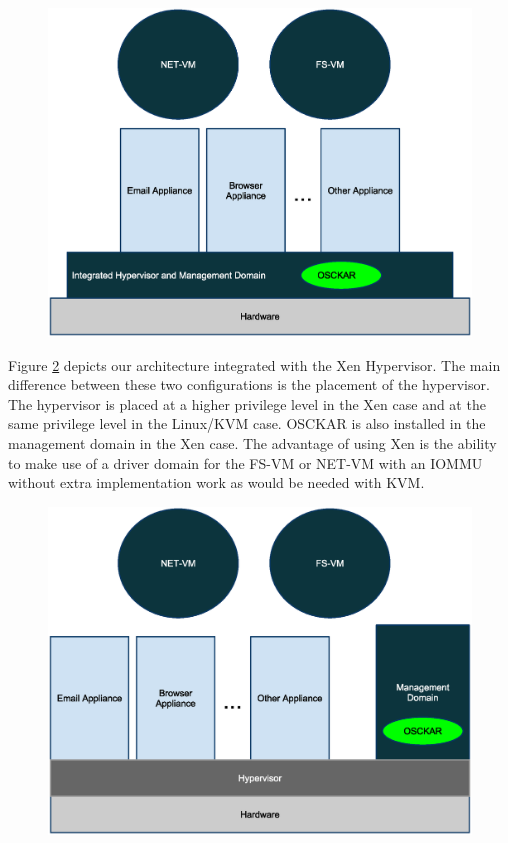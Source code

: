 \begin{figure}[tbp]
\begin{centering}
\label{fig:IntegratedHypervisor}
\includegraphics[scale=0.7,angle=90]{figs/IntegratedHypervisorArchitecture}
\end{centering}
\end{figure}

Figure \ref{fig:StandAloneHypervisor} depicts our architecture integrated with the Xen Hypervisor. The main difference between these two configurations is the placement of the hypervisor. The hypervisor is placed at a higher privilege level in the Xen case and at the same privilege level in the Linux/KVM case. OSCKAR is also installed in the management domain in the Xen case. The advantage of using Xen is the ability to make use of a driver domain for the FS-VM or NET-VM with an IOMMU without extra implementation work as would be needed with KVM.

\begin{figure}[tbp]
\begin{centering}
\label{fig:StandAloneHypervisor}
\includegraphics[scale=0.7,angle=90]{figs/StandAloneHypervisorArchitecture}
\end{centering}
\end{figure}

